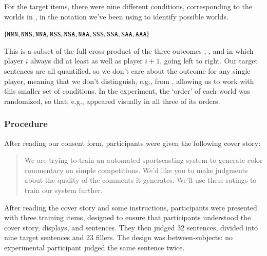 \documentclass[leqno,12pt]{article}
\begin{document}
For the target items, there were nine different conditions,
corresponding to the worlds in , in the notation we've been
using to identify possible worlds.
%
\begin{examples}
\item\label{conds} $\left\{ \texttt{NNN}, \texttt{NNS}, \texttt{NNA},
    \texttt{NSS}, \texttt{NSA}, \texttt{NAA}, \texttt{SSS}, \texttt{SSA},
    \texttt{SAA}, \texttt{AAA} \right\}$
\end{examples}
%
%
This is a subset of the full cross-product of the three outcomes
, , and  in which player $i$ always did at
least as well as player $i+1$, going left to right.  Our target
sentences are all quantified, so we don't care about the outcome for
any single player, meaning that we don't distinguish, e.g.,
 from , allowing us to work with this smaller
set of conditions. In the experiment, the `order' of each world was
randomized, so that, e.g.,  appeared visually in all three
of its orders.  




\subsubsection{Procedure} 

After reading our consent form, participants were given the following
cover story:

\begin{quote}
  We are trying to train an automated sportscasting system to generate
  color commentary on simple competitions. We'd like you to make
  judgments about the quality of the comments it generates. We'll use
  these ratings to train our system further.
\end{quote}

After reading the cover story and some instructions, participants were
presented with three training items, designed to ensure that participants
understood the cover story, displays, and sentences. They then judged 32
sentences, divided into nine target sentences and 23 fillers. The
design was between-subjects: no experimental participant judged the same sentence twice. 
 
\end{document}
